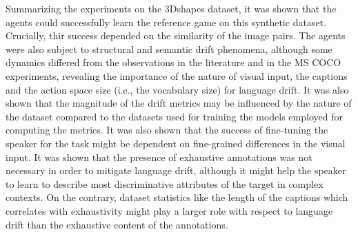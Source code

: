 Summarizing the experiments on the 3Dshapes dataset, it was shown that the agents could successfully learn the reference game on this synthetic dataset. Crucially, thir success depended on the similarity of the image pairs. 
The agents were also subject to structural and semantic drift phenomena, although some dynamics differed from the observations in the literature and in the MS COCO experiments, revealing the importance of the nature of visual input, the captions and the action space size (i.e., the vocabulary size) for language drift. It was also shown that the magnitude of the drift metrics may be influenced by the nature of the dataset compared to the datasets used for training the models employed for computing the metrics. It was also shown that the success of fine-tuning the speaker for the task might be dependent on fine-grained differences in the visual input. 
It was shown that the presence of exhaustive annotations was not necessary in order to mitigate language drift, although it might help the speaker to learn to describe most discriminative attributes of the target in complex contexts. On the contrary, dataset statistics like the length of the captions which correlates with exhaustivity might play a larger role with respect to language drift than the exhaustive content of the annotations.

